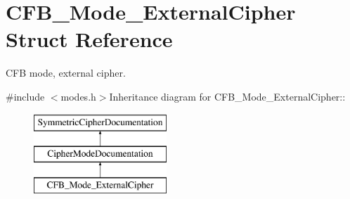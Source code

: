 \hypertarget{struct_c_f_b___mode___external_cipher}{
\section{CFB\_\-Mode\_\-ExternalCipher Struct Reference}
\label{struct_c_f_b___mode___external_cipher}
}


CFB mode, external cipher.  


{\ttfamily \#include $<$modes.h$>$}Inheritance diagram for CFB\_\-Mode\_\-ExternalCipher::\begin{figure}[H]
\begin{center}
\leavevmode
\includegraphics[height=3cm]{struct_c_f_b___mode___external_cipher}
\end{center}
\end{figure}
